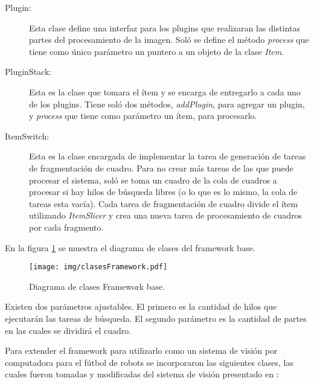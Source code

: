 \begin{description}
	\item[Plugin:] Esta clase define una interfaz para los plugins que
		realizaran las distintas partes del procesamiento de la imagen.
		Soló se define el método \emph{process} que tiene como único
		parámetro un puntero a un objeto de la clase \emph{Item}.

	\item[PluginStack:] Esta es la clase que tomara el ítem y se encarga de
		entregarlo a cada uno de los plugins. Tiene soló dos métodos,
		\emph{addPlugin}, para agregar un plugin, y \emph{process} que
		tiene como parámetro un ítem, para procesarlo.

	\item[ItemSwitch:] Esta es la clase encargada de implementar la tarea de
		generación de tareas de fragmentación de cuadro. Para no crear
		más tareas de las que puede procesar el sistema, soló se toma un
		cuadro de la cola de cuadros a procesar si hay hilos de búsqueda
		libres (o lo que es lo mismo, la cola de tareas esta vacía).
		Cada tarea de fragmentación de cuadro divide el ítem utilizando
		\emph{ItemSlicer} y crea una nueva tarea de procesamiento de
		cuadros por cada fragmento.

\end{description}

En la figura \ref{clasesFramework} se muestra el diagrama de clases del
framework base.

\begin{figure}[h]

	\texttt{[image: img/clasesFramework.pdf]}

	\caption{Diagrama de clases Framework base.}

	\label{clasesFramework}

\end{figure}

Existen dos parámetros ajustables. El primero es la cantidad de hilos que
ejecutarán las tareas de búsqueda. El segundo parámetro es la cantidad de partes
en las cuales se dividirá el cuadro.

Para extender el framework para utilizarlo como un sistema de visión por
computadora para el fútbol de robots se incorporaron las siguientes clases, las
cuales fueron tomadas y modificadas del sistema de visión presentado en
\cite{torres2014}:

